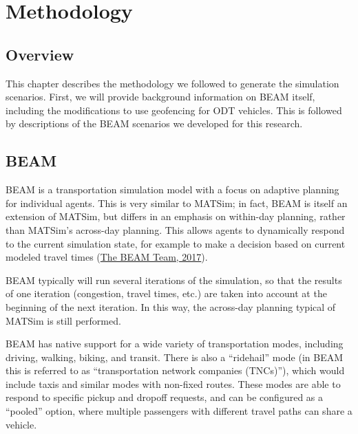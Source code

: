 \documentclass[
]{report}
\begin{document}
\hypertarget{methodology}{%
\chapter{Methodology}\label{methodology}}

\hypertarget{overview-1}{%
\section{Overview}\label{overview-1}}

This chapter describes the methodology we followed to generate the simulation scenarios. First, we will provide background information on BEAM itself, including the modifications to use geofencing for ODT vehicles. This is followed by descriptions of the BEAM scenarios we developed for this research.

\hypertarget{beam}{%
\section{BEAM}\label{beam}}

BEAM is a transportation simulation model with a focus on adaptive planning for individual agents. This is very similar to MATSim; in fact, BEAM is itself an extension of MATSim, but differs in an emphasis on within-day planning, rather than MATSim's across-day planning. This allows agents to dynamically respond to the current simulation state, for example to make a decision based on current modeled travel times (\protect\hyperlink{ref-beamdocs}{The BEAM Team, 2017}).

BEAM typically will run several iterations of the simulation, so that the results of one iteration (congestion, travel times, etc.) are taken into account at the beginning of the next iteration. In this way, the across-day planning typical of MATSim is still performed.

BEAM has native support for a wide variety of transportation modes, including driving, walking, biking, and transit. There is also a ``ridehail'' mode (in BEAM this is referred to as ``transportation network companies (TNCs)''), which would include taxis and similar modes with non-fixed routes. These modes are able to respond to specific pickup and dropoff requests, and can be configured as a ``pooled'' option, where multiple passengers with different travel paths can share a vehicle.
\end{document}
